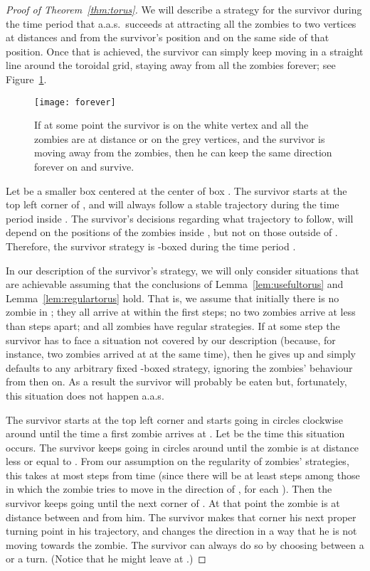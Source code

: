 \documentclass[12pt]{amsart}
\begin{document}
\begin{proof}[Proof of Theorem~\ref{thm:torus}]
We will describe a strategy for the survivor during the time period  that a.a.s.\ succeeds at attracting all the zombies to two vertices at distances  and  from the survivor's position
and on the same side of that position. Once that is achieved, the survivor can simply keep moving in a straight line around the toroidal grid, staying away from all the zombies forever; see Figure~\ref{fig:forever}.
\begin{figure}
\texttt{[image: forever]}
\caption{If at some point the survivor is on the white vertex and all the zombies are at distance  or  on the grey vertices, and the survivor is moving away from the zombies,
then he can keep the same direction forever on  and survive.}
\label{fig:forever}
\end{figure}


Let  be a smaller  box centered at the center of box . The survivor starts at the top left corner  of , and will always follow a stable trajectory 
during the time period  inside . The survivor's decisions regarding what trajectory to follow, will depend on the positions of the zombies inside , but not on those outside of . Therefore, the
survivor strategy is -boxed during the time period .

In our description of the survivor's strategy, we will only consider situations that are achievable assuming that the conclusions of Lemma~\ref{lem:usefultorus} and Lemma~\ref{lem:regulartorus} hold. That is, we assume that initially there is no zombie in ; they all arrive at  within the first  steps; no two zombies arrive at  less than  steps apart; and all zombies have
regular strategies. If at some step the survivor has to face a situation not covered by our description (because, for instance, two zombies arrived at  at the same time), then he gives up and simply defaults to
any arbitrary fixed -boxed strategy, ignoring the zombies' behaviour from then on. As a result the survivor will probably be eaten but, fortunately, this situation does not happen a.a.s.


The survivor starts at the top left corner  and starts going in circles clockwise around  until the time a first zombie arrives at . Let  be the time this situation occurs. The survivor keeps
going in circles around  until the zombie is at distance  less or equal to . From our assumption on the regularity of zombies' strategies, this takes at most  steps from time  (since
there will be at least  steps among those in which the zombie tries to move in the direction of , for each ). Then the survivor keeps going until
the next corner  of . At that point the zombie is at distance between  and  from him. The survivor makes that corner  his next proper turning point in his
trajectory, and changes the direction in a way that he is not moving towards the zombie. The survivor can always do so by choosing between a  or a  turn.  (Notice that he might leave  at .)


\end{proof}
\end{document}
